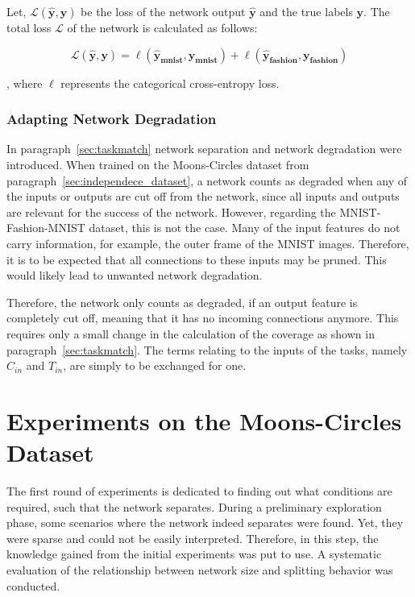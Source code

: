 Let, $\mathcal{L} (\mathbf{\hat y}, \mathbf{y})$ be the loss of the network output $\mathbf{\hat y}$ and the true labels $\mathbf{y}$.
The total loss $\mathcal{L}$ of the network is calculated as follows:

\[
\mathcal{L}  (\mathbf{\hat y}, \mathbf{y})
= \ell  (\mathbf{\hat y_{mnist}}, \mathbf{y_{mnist}})
+ \ell (\mathbf{\hat y_{fashion}}, \mathbf{y_{fashion}})
\]

, where $\ell$ represents the categorical cross-entropy loss.

\subsubsection{Adapting Network Degradation}
In paragraph~\ref{sec:taskmatch} network separation and network degradation were introduced.
When trained on the Moons-Circles dataset from paragraph~\ref{sec:independece_dataset}, a network counts as degraded when any of the inputs or outputs are cut off from the network, since all inputs and outputs are relevant for the success of the network.
However, regarding the MNIST-Fashion-MNIST dataset, this is not the case.
Many of the input features do not carry information, for example, the outer frame of the MNIST images.
Therefore, it is to be expected that all connections to these inputs may be pruned.
This would likely lead to unwanted network degradation.

Therefore, the network only counts as degraded, if an output feature is completely cut off, meaning that it has no incoming connections anymore.
This requires only a small change in the calculation of the coverage as shown in paragraph~\ref{sec:taskmatch}.
The terms relating to the inputs of the tasks, namely $C_{in}$ and $T_{in}$, are simply to be exchanged for one.

\section{Experiments on the Moons-Circles Dataset}
The first round of experiments is dedicated to finding out what conditions are required, such that the network separates.
During a preliminary exploration phase, some scenarios where the network indeed separates were found.
Yet, they were sparse and could not be easily interpreted.
Therefore, in this step, the knowledge gained from the initial experiments was put to use.
A systematic evaluation of the relationship between network size and splitting behavior was conducted.

